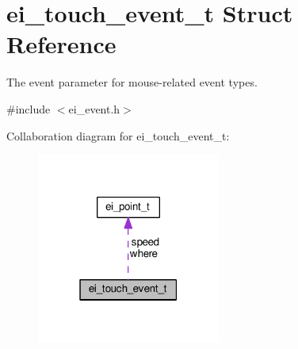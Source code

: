 \hypertarget{structei__touch__event__t}{}\section{ei\+\_\+touch\+\_\+event\+\_\+t Struct Reference}
\label{structei__touch__event__t}


The event parameter for mouse-\/related event types.  




{\ttfamily \#include $<$ei\+\_\+event.\+h$>$}



Collaboration diagram for ei\+\_\+touch\+\_\+event\+\_\+t\+:\nopagebreak
\begin{figure}[H]
\begin{center}
\leavevmode
\includegraphics[width=171pt]{structei__touch__event__t__coll__graph}
\end{center}
\end{figure}

